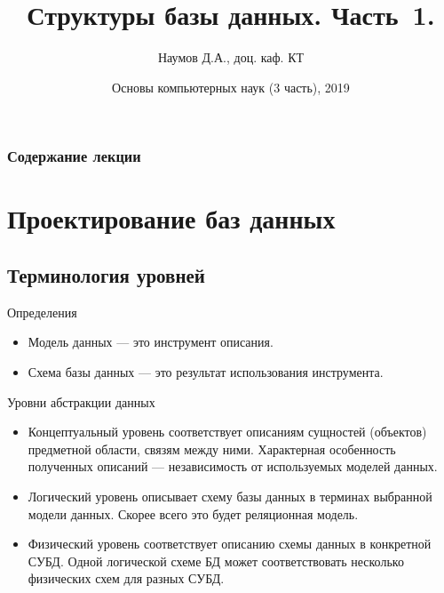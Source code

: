\documentclass{beamer}
\title[СУБД]{Структуры базы данных. Часть~1. }
\author{Наумов Д.А., доц. каф. КТ}
\date[14.03.2019] {Основы компьютерных наук (3 часть), 2019}
\begin{document}
\begin{frame}
  \titlepage
\end{frame}
  
\begin{frame}
  \frametitle{Содержание лекции}
  \tableofcontents  
\end{frame}
  
\section{Проектирование баз данных}
\subsection{Терминология уровней}
\begin{frame}
\begin{block}{Определения}
\begin{itemize}
\item Модель данных — это инструмент описания.
\item Схема базы данных — это результат использования инструмента.
\end{itemize}
\end{block}
\begin{block}{Уровни абстракции данных}
\begin{itemize}
\item Концептуальный уровень соответствует описаниям сущностей (объектов) предметной области, связям между ними. Характерная особенность  полученных  описаний  —  независимость  от используемых моделей данных. 
\item Логический уровень описывает схему базы данных в терминах выбранной модели данных. Скорее всего это будет реляционная модель.
\item Физический уровень соответствует описанию схемы данных в конкретной  СУБД.  Одной  логической  схеме  БД  может соответствовать несколько физических схем для разных СУБД.
\end{itemize}
\end{block}
\end{frame} 
\end{document}
